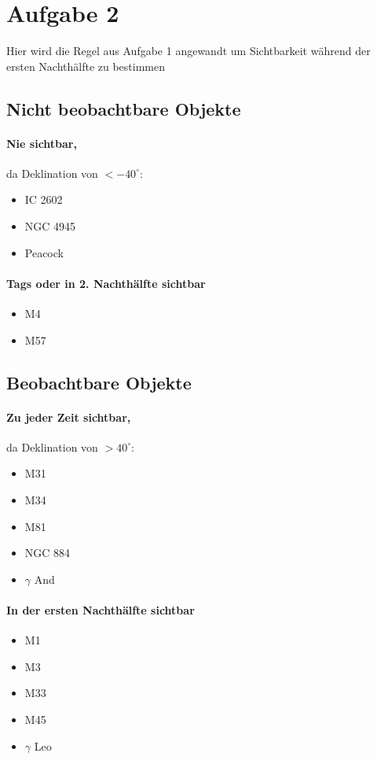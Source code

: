 \documentclass[titlepage]{scrartcl}
\begin{document}
\section{Aufgabe 2}
Hier wird die Regel aus Aufgabe 1 angewandt um Sichtbarkeit während der ersten Nachthälfte zu bestimmen
\begin{multicols}{2}
\subsection{Nicht beobachtbare Objekte}
\paragraph{Nie sichtbar,} da Deklination von $<-40^\circ$:
\begin{itemize}
\item IC 2602
\item NGC 4945
\item Peacock
\end{itemize}
\paragraph{Tags oder in 2. Nachthälfte sichtbar}
\begin{itemize}
\item M4
\item M57
\end{itemize}
\subsection{Beobachtbare Objekte}
\paragraph{Zu jeder Zeit sichtbar,} da Deklination von $>40^\circ$:
\begin{itemize}
\item M31
\item M34
\item M81
\item NGC 884
\item $\gamma$ And
\end{itemize}
\paragraph{In der ersten Nachthälfte sichtbar}
\begin{itemize}
\item M1
\item M3
\item M33
\item M45
\item $\gamma$ Leo
\end{itemize}
\end{multicols}
\end{document}
